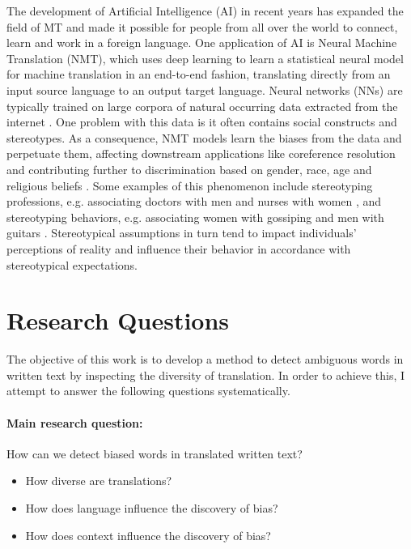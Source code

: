 The development of Artificial Intelligence (AI) in recent years has expanded the field of MT and made it possible for people from all over the world to connect, learn and work in a foreign language. One application of AI is Neural Machine Translation (NMT), which uses deep learning to learn a statistical neural model for machine translation in an end-to-end fashion, translating directly from an input source language to an output target language. Neural networks (NNs) are typically trained on large corpora of natural occurring data extracted from the internet \parencite{NMT}. 
One problem with this data is it often contains social constructs and stereotypes. As a consequence, NMT models learn the biases from the data and perpetuate them, affecting downstream applications like coreference resolution \parencite{Zhao_2018_coreference} and contributing further to discrimination based on gender, race, age and religious beliefs \parencite{Rudinger_2017}. Some examples of this phenomenon include stereotyping professions, e.g. associating doctors with men and nurses with women \parencite{Escud_Font_2019}, and stereotyping behaviors, e.g. associating women with gossiping and men with guitars \parencite{Rudinger_2017}. Stereotypical assumptions in turn tend to impact individuals' perceptions of reality and influence their behavior in accordance with stereotypical expectations.

\section{Research Questions}
\label{sec:Introduction:Questions}

The objective of this work is to develop a method to detect ambiguous words in written text by inspecting the diversity of translation. In order to achieve this, I attempt to answer the following questions systematically.

\paragraph{Main research question: } How can we detect biased words in translated written text?
\begin{itemize}
    \item How diverse are translations?
    \item How does language influence the discovery of bias? 
    \item How does context influence the discovery of bias? 
\end{itemize}

